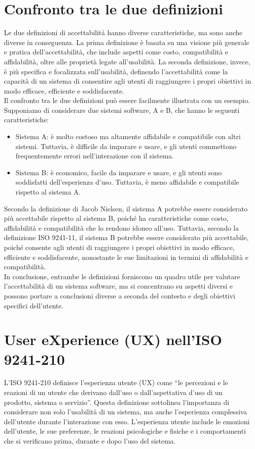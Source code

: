 \documentclass{report}
\begin{document}
	\section{Confronto tra le due definizioni}
	Le due definizioni di accettabilità hanno diverse caratteristiche, ma sono anche diverse in conseguenza. La prima definizione è basata su una visione più generale e pratica dell'accettabilità, che include aspetti come costo, compatibilità e affidabilità, oltre alle proprietà legate all'usabilità. La seconda definizione, invece, è più specifica e focalizzata sull'usabilità, definendo l'accettabilità come la capacità di un sistema di consentire agli utenti di raggiungere i propri obiettivi in modo efficace, efficiente e soddisfacente.\\
	Il confronto tra le due definizioni può essere facilmente illustrata con un esempio. Supponiamo di considerare due sistemi software, A e B, che hanno le seguenti caratteristiche:
	\begin{itemize}
		\item Sistema A: è molto costoso ma altamente affidabile e compatibile con altri sistemi. Tuttavia, è difficile da imparare e usare, e gli utenti commettono frequentemente errori nell'interazione con il sistema.
		\item Sistema B: è economico, facile da imparare e usare, e gli utenti sono soddisfatti dell'esperienza d'uso. Tuttavia, è meno affidabile e compatibile rispetto al sistema A.
	\end{itemize}
	Secondo la definizione di Jacob Nielsen, il sistema A potrebbe essere considerato più accettabile rispetto al sistema B, poiché ha caratteristiche come costo, affidabilità e compatibilità che lo rendono idoneo all'uso. Tuttavia, secondo la definizione ISO 9241-11, il sistema B potrebbe essere considerato più accettabile, poiché consente agli utenti di raggiungere i propri obiettivi in modo efficace, efficiente e soddisfacente, nonostante le sue limitazioni in termini di affidabilità e compatibilità.\\
	In conclusione, entrambe le definizioni forniscono un quadro utile per valutare l'accettabilità di un sistema software, ma si concentrano su aspetti diversi e possono portare a conclusioni diverse a seconda del contesto e degli obiettivi specifici dell'utente.

	\section{User eXperience (UX) nell'ISO 9241-210}
	L'ISO 9241-210 definisce l'esperienza utente (UX) come \enquote{le percezioni e le reazioni di un utente che derivano dall'uso o dall'aspettativa d'uso di un prodotto, sistema o servizio}. Questa definizione sottolinea l'importanza di considerare non solo l'usabilità di un sistema, ma anche l'esperienza complessiva dell'utente durante l'interazione con esso. L'esperienza utente include le emozioni dell'utente, le sue preferenze, le reazioni psicologiche e fisiche e i comportamenti che si verificano prima, durante e dopo l'uso del sistema.
\end{document}
